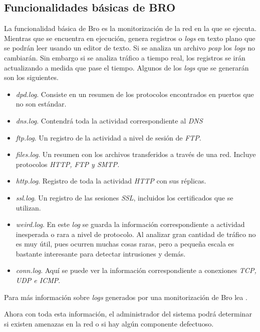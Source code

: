 \subsection{Funcionalidades básicas de BRO}

La funcionalidad básica de Bro es la monitorización de la red en la que se ejecuta. 
Mientras que se encuentra en ejecución, genera registros o \textit{logs} en texto plano que se 
podrán leer usando un editor de texto. Si se analiza un archivo \textit{pcap} los \textit{logs} no cambiarán. Sin 
embargo si se analiza tráfico a tiempo real, los registros se irán actualizando a medida que pase el tiempo. 
Algunos de los \textit{logs} que se generarán son los siguientes.

\begin{itemize}
\item \textit{dpd.log}. Consiste en un resumen de los protocolos encontrados en puertos que no son estándar.
\item \textit{dns.log}. Contendrá toda la actividad correspondiente al \textit{DNS}
\item \textit{ftp.log}. Un registro de la actividad a nivel de sesión de \textit{FTP}.
\item \textit{files.log}. Un resumen con los archivos transferidos a través de una red. Incluye 
protocolos \textit{HTTP, FTP y SMTP.}
\item \textit{http.log}. Registro de toda la actividad \textit{HTTP} con sus réplicas.
\item \textit{ssl.log}. Un registro de las sesiones \textit{SSL}, incluidos los certificados que se utilizan.
\item \textit{weird.log}. En este \textit{log} se guarda la información correspondiente a actividad 
inesperada o rara a nivel de protocolo. Al analizar gran cantidad de tráfico no es muy útil, pues ocurren 
muchas cosas raras, pero a pequeña escala es bastante interesante para detectar intrusiones y demás.
\item \textit{conn.log}. Aquí se puede ver la información correspondiente a conexiones  \textit{TCP, UDP e ICMP}.
\end{itemize}

\intro Para más información sobre \textit{logs} generados por una monitorización de Bro lea \cite{brologs}.

\intro Ahora con toda esta información, el administrador del sistema podrá determinar si existen amenazas en 
la red o si hay algún componente defectuoso.

